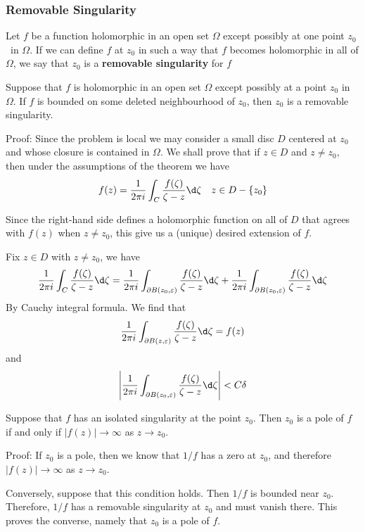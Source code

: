 \documentclass[12pt, oneside]{book}
\begin{document}
\subsubsection{Removable Singularity}
\begin{definition}
    Let $f$ be a function holomorphic in an open set $\Omega$ except possibly at one point $z_0$\ in $\Omega$. If we can define $f$ at $z_0$ in such a way that $f$ becomes holomorphic in all of $\Omega$, we say that $z_0$ is a \textbf{removable singularity} for $f$
\end{definition}
\begin{theorem}
    Suppose that $f$ is holomorphic in an open set $\Omega$ except possibly at a point $z_0$ in $\Omega$. If $f$ is bounded on some deleted neighbourhood of $z_0$, then $z_0$ is a removable singularity.

    Proof: Since the problem is local we may consider a small disc $D$ centered at $z_0$ and whose closure is contained in $\Omega$. We shall prove that if $z
        \in D$ and $z\neq z_0$, then under the assumptions of the
    theorem we have
    $$f(z)=\frac{1}{2\pi i}\int_C\frac{f(\zeta)}{\zeta-z}\d \zeta\quad z\in D-\{z_0\}$$

    Since the right-hand side defines a holomorphic function on all of $D$ that agrees with $f(z)$ when $z\neq z_0$, this give us a (unique) desired extension of $f$.

    Fix $z\in D$ with $z\neq z_0$, we have
    $$\frac{1}{2\pi i}\int_C\frac{f(\zeta)}{\zeta-z}\d \zeta=\frac{1}{2\pi i}\int_{\partial B(z_0,\varepsilon)}\frac{f(\zeta)}{\zeta-z}\d \zeta+\frac{1}{2\pi i}\int_{\partial B(z_0,\varepsilon)}\frac{f(\zeta)}{\zeta-z}\d \zeta$$
    By Cauchy integral formula. We find that
    $$\frac{1}{2\pi i}\int_{\partial B(z,\varepsilon)}\frac{f(\zeta)}{\zeta-z}\d \zeta=f(z)$$
    and
    $$\left|\frac{1}{2\pi i}\int_{\partial B(z_0,\varepsilon)}\frac{f(\zeta)}{\zeta-z}\d \zeta\right|<C\delta$$
\end{theorem}
\begin{corollary}
    Suppose that $f$ has an isolated singularity at the point
    $z_0$. Then $z_0$ is a pole of $f$ if and only if $\left|f(z)\right| \to \infty$  as $z\to z_0$.

    Proof: If $z_0$ is a pole, then we know that $1/f$ has a zero at $z_0$, and therefore $\left|f(z)\right|\to\infty$ as $z\to z_0$.

    Conversely, suppose that this condition holds. Then $1/f$ is bounded near $z_0$. Therefore, $1/f$ has a removable singularity at $z_0$ and must vanish there. This proves the converse, namely that $z_0$ is a pole of $f$.
\end{corollary}
\end{document}

